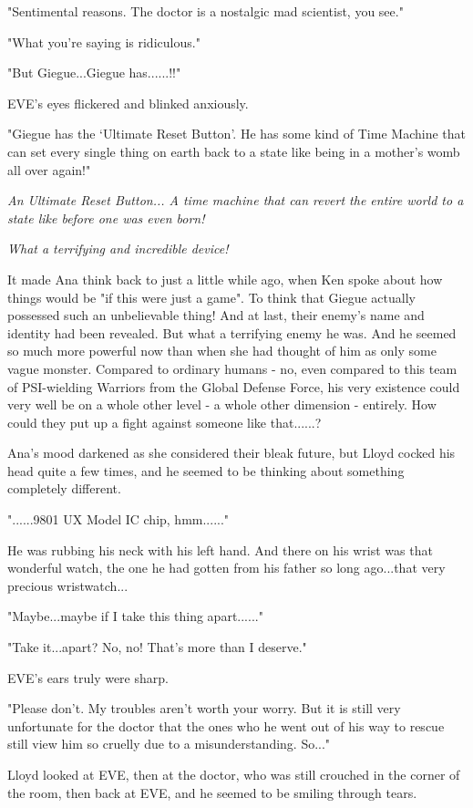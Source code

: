 \documentclass[
]{article}
\begin{document}
"Sentimental reasons. The doctor is a nostalgic mad scientist, you see."

"What you're saying is ridiculous."

"But Giegue...Giegue has......!!"

EVE's eyes flickered and blinked anxiously.

"Giegue has the `Ultimate Reset Button'. He has some kind of Time
Machine that can set every single thing on earth back to a state like
being in a mother's womb all over again!"

\emph{An Ultimate Reset Button... A time machine that can revert the
entire world to a state like before one was even born!}

\emph{What a terrifying and incredible device!}

It made Ana think back to just a little while ago, when Ken spoke about
how things would be "if this were just a game". To think that Giegue
actually possessed such an unbelievable thing! And at last, their
enemy's name and identity had been revealed. But what a terrifying enemy
he was. And he seemed so much more powerful now than when she had
thought of him as only some vague monster. Compared to ordinary humans -
no, even compared to this team of PSI-wielding Warriors from the Global
Defense Force, his very existence could very well be on a whole other
level - a whole other dimension - entirely. How could they put up a
fight against someone like that......?

Ana's mood darkened as she considered their bleak future, but Lloyd
cocked his head quite a few times, and he seemed to be thinking about
something completely different.

"......9801 UX Model IC chip, hmm......"

He was rubbing his neck with his left hand. And there on his wrist was
that wonderful watch, the one he had gotten from his father so long
ago...that very precious wristwatch...

"Maybe...maybe if I take this thing apart......"

"Take it...apart? No, no! That's more than I deserve."

EVE's ears truly were sharp.

"Please don't. My troubles aren't worth your worry. But it is still very
unfortunate for the doctor that the ones who he went out of his way to
rescue still view him so cruelly due to a misunderstanding. So..."

Lloyd looked at EVE, then at the doctor, who was still crouched in the
corner of the room, then back at EVE, and he seemed to be smiling
through tears.
\end{document}
